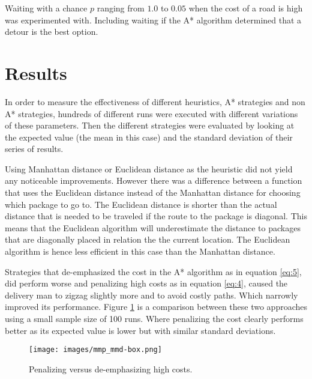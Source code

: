 \documentclass[12pt, a4paper]{article}
\begin{document}
Waiting with a chance $p$ ranging from $1.0$ to $0.05$ when the cost of a road is high was experimented with. Including waiting if the A* algorithm determined that a detour is the best option.





\section{Results}

In order to measure the effectiveness of different heuristics, A* strategies and non A* strategies, hundreds of different runs were executed with different variations of these parameters. Then the different strategies were evaluated by looking at the expected value (the mean in this case) and the standard deviation of their series of results.

Using Manhattan distance or Euclidean distance as the heuristic did not yield any noticeable improvements. However there was a difference between a function that uses the Euclidean distance instead of the Manhattan distance for choosing which package to go to. The Euclidean distance is shorter than the actual distance that is needed to be traveled if the route to the package is diagonal. This means that the Euclidean algorithm will underestimate the distance to packages that are diagonally placed in relation the the current location. The Euclidean algorithm is hence less efficient in this case than the Manhattan distance. 

Strategies that de-emphasized the cost in the A* algorithm as in equation \ref{eq:5}, did perform worse and penalizing high costs as in equation \ref{eq:4}, caused the delivery man to zigzag slightly more and to avoid costly paths. Which narrowly improved its performance. Figure \ref{mmp_mmd-box} is a comparison between these two approaches using a small sample size of 100 runs. Where penalizing the cost clearly performs better as its expected value is lower but with similar standard deviations.

\begin{figure}[!ht]
\centering
\texttt{[image: images/mmp\_mmd-box.png]}\\
\caption{Penalizing versus de-emphasizing high costs.}
\label{mmp_mmd-box}
\end{figure}
\vspace{2.5mm}
\end{document}

